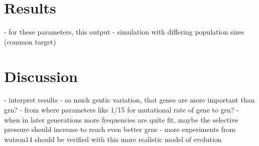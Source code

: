 \documentclass{article}
\begin{document}
\section{Results}

- for these parameters, this output
- simulation with differing population sizes (common target)

\section{Discussion}

- interpret results
- so much gentic variation, that genes are more important than grn?
- from where parameters like 1/15 for mutational rate of gene to grn?
- when in later generations more frequencies are quite fit, maybe the selective pressure should increase to reach even better grns
- more experiments from watson14 should be verified with this more realistic model of evolution

\newpage


\begin{appendix}
  \listoffigures
  \listoftables
\end{appendix}
\end{document}
